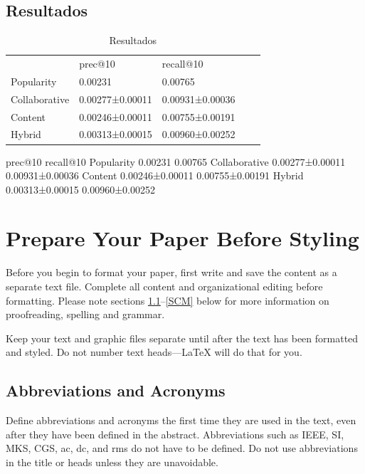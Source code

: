 \documentclass[conference]{IEEEtran}
\begin{document}
\subsection{Resultados}


\begin{table}[]
\centering
\caption{Resultados}
\begin{tabular}{lllll}
		 & prec@10  & recall@10\\
Popularity        & 0.00231 & 0.00765\\
Collaborative        & 0.00277±0.00011& 0.00931±0.00036 \\
Content        & 0.00246±0.00011 & 0.00755±0.00191\\
Hybrid    & 0.00313±0.00015   & 0.00960±0.00252 
\end{tabular}
\end{table}


prec@10 recall@10
Popularity 0.00231 0.00765
Collaborative 0.00277±0.00011 0.00931±0.00036
Content 0.00246±0.00011 0.00755±0.00191
Hybrid 0.00313±0.00015 0.00960±0.00252



\section{Prepare Your Paper Before Styling}
Before you begin to format your paper, first write and save the content as a 
separate text file. Complete all content and organizational editing before 
formatting. Please note sections \ref{AA}--\ref{SCM} below for more information on 
proofreading, spelling and grammar.

Keep your text and graphic files separate until after the text has been 
formatted and styled. Do not number text heads---{\LaTeX} will do that 
for you.

\subsection{Abbreviations and Acronyms}\label{AA}
Define abbreviations and acronyms the first time they are used in the text, 
even after they have been defined in the abstract. Abbreviations such as 
IEEE, SI, MKS, CGS, ac, dc, and rms do not have to be defined. Do not use 
abbreviations in the title or heads unless they are unavoidable.
\end{document}
